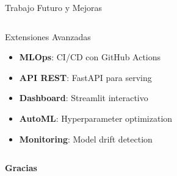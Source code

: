 \documentclass[aspectratio=169]{beamer}
\begin{document}
\begin{frame}{Trabajo Futuro y Mejoras}
\begin{columns}[T]
        \begin{column}{0.48\textwidth}
            \begin{block}{Extensiones Avanzadas}
                \begin{itemize}
                    \item \textbf{MLOps}: CI/CD con GitHub Actions
                    \item \textbf{API REST}: FastAPI para serving
                    \item \textbf{Dashboard}: Streamlit interactivo
                    \item \textbf{AutoML}: Hyperparameter optimization
                    \item \textbf{Monitoring}: Model drift detection
                \end{itemize}
            \end{block}
        \end{column}
    \end{columns}
\end{frame}

\begin{frame}[plain]
    \begin{center}
        \vspace{2cm}
        {\Huge \textbf{Gracias}}
        
        \vspace{1cm}
        
        
        \vspace{1.5cm}
        
        
        \vspace{0.5cm}
        
    \end{center}
\end{frame}
\end{document}
